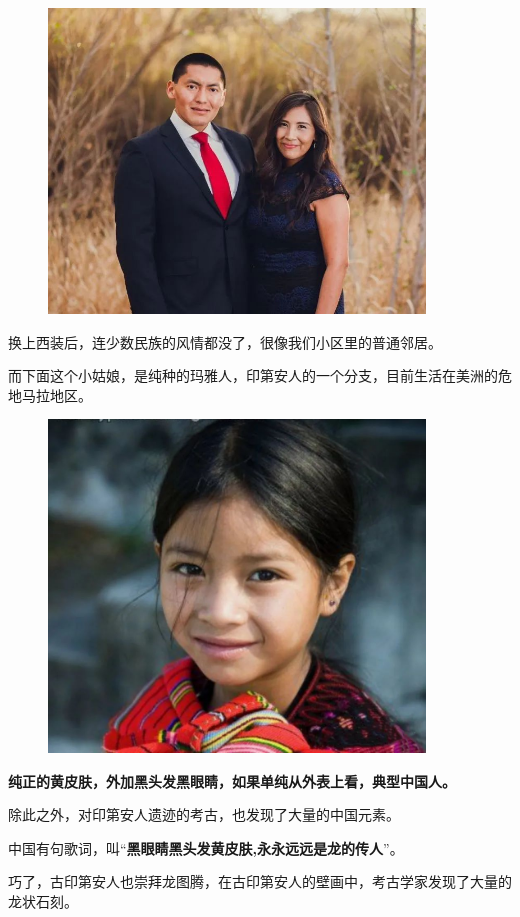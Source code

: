 \documentclass[UTF8, 11pt, oneside]{ctexart}
\newcommand{\zd}[1]{\textbf{\textcolor[RGB]{123,12,0}{#1}}} %
\begin{document}
\begin{figure}[H]
    \centering
    \includegraphics[width=10cm]{2023-10-13-005}
\end{figure}

换上西装后，连少数民族的风情都没了，很像我们小区里的普通邻居。

而下面这个小姑娘，是纯种的玛雅人，印第安人的一个分支，目前生活在美洲的危地马拉地区。

\begin{figure}[H]
    \centering
    \includegraphics[width=10cm]{2023-10-13-006}
\end{figure}

\zd{纯正的黄皮肤，外加黑头发黑眼睛，如果单纯从外表上看，典型中国人。}

除此之外，对印第安人遗迹的考古，也发现了大量的中国元素。

中国有句歌词，叫“\zd{黑眼睛黑头发黄皮肤,永永远远是龙的传人}”。

巧了，古印第安人也崇拜龙图腾，在古印第安人的壁画中，考古学家发现了大量的龙状石刻。
\end{document}

